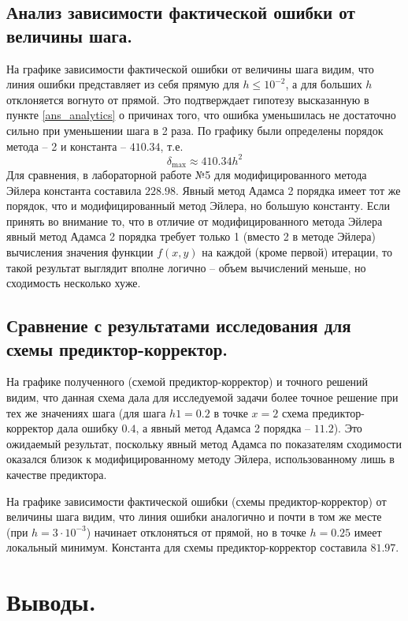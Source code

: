 \documentclass[a4paper, 12pt]{article}
\begin{document}
	\subsection{Анализ зависимости фактической ошибки от величины шага.}
	
	На графике зависимости фактической ошибки от величины шага видим, что линия ошибки представляет из себя прямую для $h\leq10^{-2}$, а для больших $h$ отклоняется вогнуто от прямой. Это подтверждает гипотезу высказанную в пункте \ref{ans_analytics} о причинах того, что ошибка уменьшилась не достаточно сильно при уменьшении шага в 2 раза. По графику были определены порядок метода -- 2 и константа -- $410.34$, т.е.
	\begin{equation}
		\delta_{\text{max}}\approx410.34h^2
	\end{equation}
	Для сравнения, в лабораторной работе №5 для модифицированного метода Эйлера константа составила $228.98$. Явный метод Адамса 2 порядка имеет тот же порядок, что и модифицированный метод Эйлера, но большую константу. Если принять во внимание то, что в отличие от модифицированного метода Эйлера явный метод Адамса 2 порядка требует только 1 (вместо 2 в методе Эйлера) вычисления значения функции $f(x,y)$ на каждой (кроме первой) итерации, то такой результат выглядит вполне логично -- объем вычислений меньше, но сходимость несколько хуже.

	\subsection{Сравнение с результатами исследования для схемы предиктор-корректор.}
	
	На графике полученного (схемой предиктор-корректор) и точного решений видим, что данная схема дала для исследуемой задачи более точное решение при тех же значениях шага (для шага $h1=0.2$ в точке $x=2$ схема предиктор-корректор дала ошибку $0.4$, а явный метод Адамса 2 порядка -- $11.2$). Это ожидаемый результат, поскольку явный метод Адамса по показателям сходимости оказался близок к модифицированному методу Эйлера, использованному лишь в качестве предиктора.
	
	На графике зависимости фактической ошибки (схемы предиктор-корректор) от величины шага видим, что линия ошибки аналогично и почти в том же месте (при $h=3\cdot10^{-3}$) начинает отклоняться от прямой, но в точке $h=0.25$ имеет локальный минимум. Константа для схемы предиктор-корректор составила $81.97$.
	
	\section{Выводы.}
	
\end{document}
